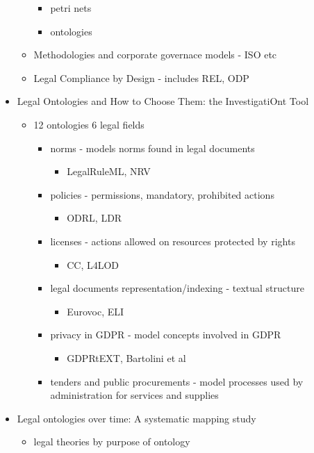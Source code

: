 \begin{itemize}
\begin{itemize}
\begin{itemize}
		\item petri nets
		\item ontologies
		\end{itemize}
	\item Methodologies and corporate governace models - ISO etc
	\item Legal Compliance by Design - includes REL, ODP
	\end{itemize}
\item Legal Ontologies and How to Choose Them: the InvestigatiOnt Tool
	\begin{itemize}
	\item 12 ontologies 6 legal fields
		\begin{itemize}
		\item norms - models norms found in legal documents
			\begin{itemize}
			\item LegalRuleML, NRV
			\end{itemize}
		\item policies - permissions, mandatory, prohibited actions
			\begin{itemize}
			\item ODRL, LDR
			\end{itemize}
		\item licenses - actions allowed on resources protected by rights
			\begin{itemize}
			\item CC, L4LOD
			\end{itemize}
		\item legal documents representation/indexing - textual structure
			\begin{itemize}
			\item Eurovoc, ELI
			\end{itemize}
		\item privacy in GDPR - model concepts involved in GDPR
			\begin{itemize}
			\item GDPRtEXT, Bartolini et al
			\end{itemize}
		\item tenders and public procurements - model processes used by administration for services and supplies
		\end{itemize}
	\end{itemize}
\item Legal ontologies over time: A systematic mapping study
	\begin{itemize}
	\item legal theories by purpose of ontology

\end{itemize}
\end{itemize}
